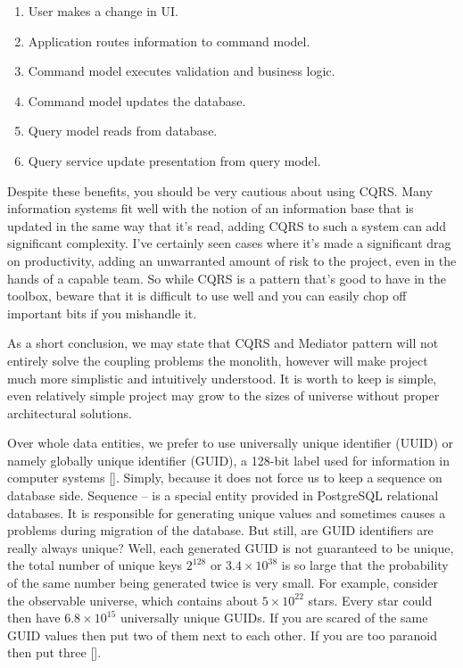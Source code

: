 \begin{enumerate}
    \item User makes a change in UI\@.
    \item Application routes information to command model.
    \item Command model executes validation and business logic.
    \item Command model updates the database.
    \item Query model reads from database.
    \item Query service update presentation from query model.
\end{enumerate}

Despite these benefits, you should be very cautious about using CQRS\@.
Many information systems fit well with the notion of an information base that is updated in the same way that it's read,
adding CQRS to such a system can add significant complexity.
I've certainly seen cases where it's made a significant drag on productivity, adding an unwarranted amount of risk to the
project, even in the hands of a capable team.
So while CQRS is a pattern that's good to have in the toolbox, beware that it is difficult to use well and you can easily
chop off important bits if you mishandle it.

As a short conclusion, we may state that CQRS and Mediator pattern will not entirely solve the coupling problems the monolith,
however will make project much more simplistic and intuitively understood.
It is worth to keep is simple,
even relatively simple project may grow to the sizes of universe without proper architectural solutions.

Over whole data entities, we prefer to use universally unique identifier (UUID) or namely globally unique identifier (GUID),
a 128-bit label used for information in computer systems [\cite{leach2005universally}].
Simply, because it does not force us to keep a sequence on database side.
Sequence -- is a special entity provided in PostgreSQL relational databases.
It is responsible for generating unique values and sometimes causes a problems during migration of the database.
But still, are GUID identifiers are really always unique?
Well, each generated GUID is not guaranteed to be unique, the total number of unique keys $2^{128}$ or $3.4 \times 10^{38}$
is so large that the probability of the same number being generated twice is very small.
For example, consider the observable universe, which contains about $5 \times 10^{22}$ stars.
Every star could then have $6.8 \times 10^{15}$ universally unique GUIDs.
If you are scared of the same GUID values then put two of them next to each other.
If you are too paranoid then put three [\cite{GUIDSo}].
